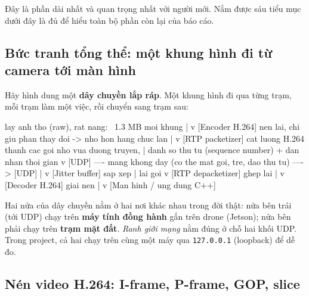 \documentclass[12pt]{ai_conquer2026}
\begin{document}
Đây là phần dài nhất và quan trọng nhất với người mới. Nắm được sáu tiểu mục
dưới đây là đủ để hiểu toàn bộ phần còn lại của báo cáo.

\subsection{Bức tranh tổng thể: một khung hình đi từ camera tới màn hình}

Hãy hình dung một \textbf{dây chuyền lắp ráp}. Một khung hình đi qua từng trạm,
mỗi trạm làm một việc, rồi chuyển sang trạm sau:

\begin{aivnoutputbox}            lay anh tho (raw), rat nang: ~1.3 MB moi khung
   |
   v
[Encoder H.264]     nen lai, chi giu phan thay doi -> nho hon hang chuc lan
   |
   v
[RTP packetizer]    cat luong H.264 thanh cac goi nho vua duong truyen,
   |                danh so thu tu (sequence number) + dan nhan thoi gian
   v
[UDP] ---- mang khong day (co the mat goi, tre, dao thu tu) ----> [UDP]
                                                                    |
                                                                    v
                                                       [Jitter buffer]  sap xep
                                                                    |    lai goi
                                                                    v
                                                       [RTP depacketizer] ghep lai
                                                                    |
                                                                    v
                                                       [Decoder H.264]  giai nen
                                                                    |
                                                                    v
                                                       [Man hinh / ung dung C++]
\end{aivnoutputbox}

Hai nửa của dây chuyền nằm ở hai nơi khác nhau trong đời thật: nửa bên trái (tới
UDP) chạy trên \textbf{máy tính đồng hành} gắn trên drone (Jetson); nửa bên phải
chạy trên \textbf{trạm mặt đất}. \emph{Ranh giới mạng} nằm đúng ở chỗ hai khối
UDP. Trong project, cả hai chạy trên cùng một máy qua \texttt{127.0.0.1}
(loopback) để dễ đo.

\subsection{Nén video H.264: I-frame, P-frame, GOP, slice}
\end{document}
